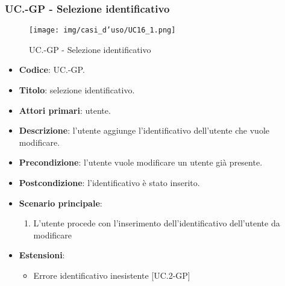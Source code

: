 	\subsubsection{UC\theuccount.\thesubuccount-GP - Selezione identificativo}
		\begin{figure}[H]
			\centering
			\texttt{[image: img/casi\_d'uso/UC16\_1.png]}\\
			\caption{UC\theuccount.\thesubuccount-GP - Selezione identificativo}
		\end{figure}
		\begin{itemize}
			\item \textbf{Codice}: UC\theuccount.\thesubuccount-GP.
			\item \textbf{Titolo}: selezione identificativo.
			\item \textbf{Attori primari}: utente.
			\item \textbf{Descrizione}: l'utente aggiunge l'identificativo dell'utente che vuole modificare.
			\item \textbf{Precondizione}: l'utente vuole modificare un utente già presente.
			\item \textbf{Postcondizione}: l'identificativo è stato inserito.
			\item \textbf{Scenario principale}:
			\begin{enumerate}
				\item L'utente procede con l'inserimento dell'identificativo dell'utente da modificare
			\end{enumerate}
			\item \textbf{Estensioni}:
			\begin{itemize}
				\item Errore identificativo inesistente [UC\theuccount.2-GP]
			\end{itemize}
		\end{itemize}
		
